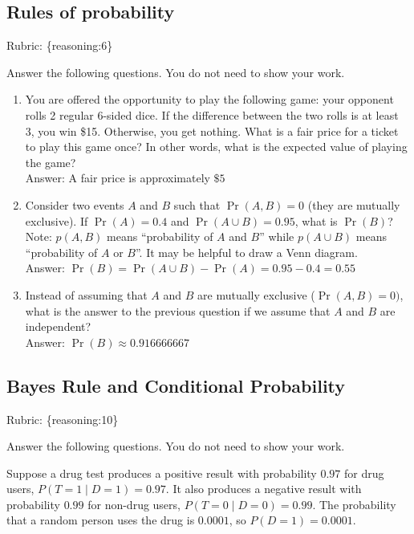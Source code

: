 \documentclass{article}
\def\rubric#1{\gre{Rubric: \{#1\}}}{}
\def\blu#1{{\color{blu}#1}}
\def\gre#1{{\color{gre}#1}}
\def\ans#1{\gre{Answer: #1}}{}
\begin{document}
\subsection{Rules of probability}
\rubric{reasoning:6}

\blu{Answer the following questions.} You do not need to show your work.


\begin{enumerate}
\item You are offered the opportunity to play the following game: your opponent rolls 2 regular 6-sided dice. If the difference between the two rolls is at least 3, you win \$15. Otherwise, you get nothing. What is a fair price for a ticket to play this game once? In other words, what is the expected value of playing the game? \\
\ans{A fair price is approximately $\$ 5$}
\item Consider two events $A$ and $B$ such that $\Pr(A, B)=0$ (they are mutually exclusive). If $\Pr(A) = 0.4$ and $\Pr(A \cup B) = 0.95$, what is $\Pr(B)$? Note: $p(A, B)$ means
``probability of $A$ and $B$'' while $p(A \cup B)$ means ``probability of $A$ or $B$''. It may be helpful to draw a Venn diagram.\\
\ans{$\Pr(B) = \Pr(A \cup B) - \Pr(A) = 0.95 - 0.4 = 0.55$}
\item Instead of assuming that $A$ and $B$ are mutually exclusive ($\Pr(A,B) = 0)$, what is the answer to the previous question if we assume that $A$ and $B$ are independent? \\
\ans{$\Pr(B) \approx 0.916666667$}

\end{enumerate}

\subsection{Bayes Rule and Conditional Probability}
\rubric{reasoning:10}

\blu{Answer the following questions.} You do not need to show your work.

Suppose a drug test produces a positive result with probability $0.97$ for drug users, $P(T=1 \mid D=1)=0.97$. It also produces a negative result with probability $0.99$ for non-drug users, $P(T=0 \mid D=0)=0.99$. The probability that a random person uses the drug is $0.0001$, so $P(D=1)=0.0001$.
\end{document}
